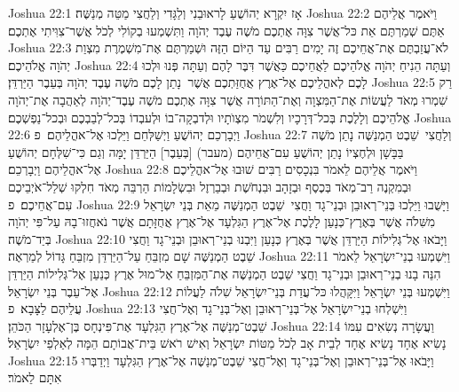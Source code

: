 Joshua 22:1	אָז יִקְרָא יְהוֹשֻׁעַ לָראוּבֵנִי וְלַגָּדִי וְלַחֲצִי מַטֵּה מְנַשֶּׁה׃
Joshua 22:2	וַיֹּאמֶר אֲלֵיהֶם אַתֶּם שְׁמַרְתֶּם אֵת כּל־אֲשֶׁר צִוָּה אֶתְכֶם מֹשֶׁה עֶבֶד יְהֹוָה וַתִּשְׁמְעוּ בְקוֹלִי לְכֹל אֲשֶׁר־צִוִּיתִי אֶתְכֶם׃
Joshua 22:3	לֹא־עֲזַבְתֶּם אֶת־אֲחֵיכֶם זֶה יָמִים רַבִּים עַד הַיּוֹם הַזֶּה וּשְׁמַרְתֶּם אֶת־מִשְׁמֶרֶת מִצְוַת יְהֹוָה אֱלֹהֵיכֶם׃
Joshua 22:4	וְעַתָּה הֵנִיחַ יְהֹוָה אֱלֹהֵיכֶם לַאֲחֵיכֶם כַּאֲשֶׁר דִּבֶּר לָהֶם וְעַתָּה פְּנוּ וּלְכוּ לָכֶם לְאהֳלֵיכֶם אֶל־אֶרֶץ אֲחֻזַּתְכֶם אֲשֶׁר  נָתַן לָכֶם מֹשֶׁה עֶבֶד יְהֹוָה בְּעֵבֶר הַיַּרְדֵּן׃
Joshua 22:5	רַק  שִׁמְרוּ מְאֹד לַעֲשׂוֹת אֶת־הַמִּצְוָה וְאֶת־הַתּוֹרָה אֲשֶׁר צִוָּה אֶתְכֶם מֹשֶׁה עֶבֶד־יְהֹוָה לְאַהֲבָה אֶת־יְהֹוָה אֱלֹהֵיכֶם וְלָלֶכֶת בְּכל־דְּרָכָיו וְלִשְׁמֹר מִצְוֺתָיו וּלְדבְקָה־בוֹ וּלְעבְדוֹ בְּכל־לְבַבְכֶם וּבְכל־נַפְשְׁכֶם׃
Joshua 22:6	וַיְבָרְכֵם יְהוֹשֻׁעַ וַיְשַׁלְּחֵם וַיֵּלְכוּ אֶל־אהֳלֵיהֶם׃ {פ}
Joshua 22:7	וְלַחֲצִי  שֵׁבֶט הַמְנַשֶּׁה נָתַן מֹשֶׁה בַּבָּשָׁן וּלְחֶצְיוֹ נָתַן יְהוֹשֻׁעַ עִם־אֲחֵיהֶם (מעבר) [בְּעֵבֶר] הַיַּרְדֵּן יָמָּה וְגַם כִּי־שִׁלְּחָם יְהוֹשֻׁעַ אֶל־אהֳלֵיהֶם וַיְבָרְכֵם׃
Joshua 22:8	וַיֹּאמֶר אֲלֵיהֶם לֵאמֹר בִּנְכָסִים רַבִּים שׁוּבוּ אֶל־אהֳלֵיכֶם וּבְמִקְנֶה רַב־מְאֹד בְּכֶסֶף וּבְזָהָב וּבִנְחֹשֶׁת וּבְבַרְזֶל וּבִשְׂלָמוֹת הַרְבֵּה מְאֹד חִלְקוּ שְׁלַל־אֹיְבֵיכֶם עִם־אֲחֵיכֶם׃ {פ}
Joshua 22:9	וַיָּשֻׁבוּ וַיֵּלְכוּ בְּנֵי־רְאוּבֵן וּבְנֵי־גָד וַחֲצִי  שֵׁבֶט הַמְנַשֶּׁה מֵאֵת בְּנֵי יִשְׂרָאֵל מִשִּׁלֹה אֲשֶׁר בְּאֶרֶץ־כְּנָעַן לָלֶכֶת אֶל־אֶרֶץ הַגִּלְעָד אֶל־אֶרֶץ אֲחֻזָּתָם אֲשֶׁר נֹאחֲזוּ־בָהּ עַל־פִּי יְהֹוָה בְּיַד־מֹשֶׁה׃
Joshua 22:10	וַיָּבֹאוּ אֶל־גְּלִילוֹת הַיַּרְדֵּן אֲשֶׁר בְּאֶרֶץ כְּנָעַן וַיִּבְנוּ בְנֵי־רְאוּבֵן וּבְנֵי־גָד וַחֲצִי שֵׁבֶט הַמְנַשֶּׁה שָׁם מִזְבֵּחַ עַל־הַיַּרְדֵּן מִזְבֵּחַ גָּדוֹל לְמַרְאֶה׃
Joshua 22:11	וַיִּשְׁמְעוּ בְנֵי־יִשְׂרָאֵל לֵאמֹר הִנֵּה בָנוּ בְנֵי־רְאוּבֵן וּבְנֵי־גָד וַחֲצִי שֵׁבֶט הַמְנַשֶּׁה אֶת־הַמִּזְבֵּחַ אֶל־מוּל אֶרֶץ כְּנַעַן אֶל־גְּלִילוֹת הַיַּרְדֵּן אֶל־עֵבֶר בְּנֵי יִשְׂרָאֵל׃
Joshua 22:12	וַיִּשְׁמְעוּ בְּנֵי יִשְׂרָאֵל וַיִּקָּהֲלוּ כּל־עֲדַת בְּנֵי־יִשְׂרָאֵל שִׁלֹה לַעֲלוֹת עֲלֵיהֶם לַצָּבָא׃ {פ}
Joshua 22:13	וַיִּשְׁלְחוּ בְנֵי־יִשְׂרָאֵל אֶל־בְּנֵי־רְאוּבֵן וְאֶל־בְּנֵי־גָד וְאֶל־חֲצִי שֵׁבֶט־מְנַשֶּׁה אֶל־אֶרֶץ הַגִּלְעָד אֶת־פִּינְחָס בֶּן־אֶלְעָזָר הַכֹּהֵן׃
Joshua 22:14	וַעֲשָׂרָה נְשִׂאִים עִמּוֹ נָשִׂיא אֶחָד נָשִׂיא אֶחָד לְבֵית אָב לְכֹל מַטּוֹת יִשְׂרָאֵל וְאִישׁ רֹאשׁ בֵּית־אֲבוֹתָם הֵמָּה לְאַלְפֵי יִשְׂרָאֵל׃
Joshua 22:15	וַיָּבֹאוּ אֶל־בְּנֵי־רְאוּבֵן וְאֶל־בְּנֵי־גָד וְאֶל־חֲצִי שֵׁבֶט־מְנַשֶּׁה אֶל־אֶרֶץ הַגִּלְעָד וַיְדַבְּרוּ אִתָּם לֵאמֹר׃
